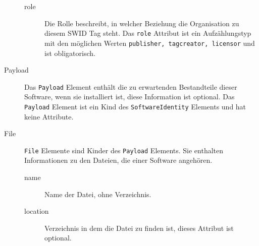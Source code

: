 \begin{description}
\begin{description}
		\item[role] Die Rolle beschreibt, in welcher Beziehung die Organisation zu
		diesem SWID Tag steht. Das \texttt{role} Attribut ist ein Aufzählungstyp mit
		den möglichen Werten \texttt{publisher, tagcreator, licensor} und ist
		obligatorisch.
	\end{description}
	
	\item[Payload] Das \texttt{Payload} Element enthält die zu erwartenden
	Bestandteile dieser Software, wenn sie installiert ist, diese Information ist
	optional. Das \texttt{Payload} Element ist ein Kind des
	\texttt{SoftwareIdentity} Elements und hat keine Attribute.
	
	\item[File] \texttt{File} Elemente sind Kinder des \texttt{Payload} Elements.
	Sie enthalten Informationen zu den Dateien, die einer Software angehören.
	\begin{description}
		\item[name] Name der Datei, ohne Verzeichnis.
		\item[location] Verzeichnis in dem die Datei zu finden ist, dieses Attribut
		ist optional.
	\end{description}
	
\end{description}

